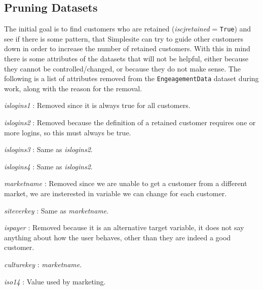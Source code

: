 \subsection{Pruning Datasets}

The initial goal is to find customers who are retained (\textit{iscjretained} =
\texttt{True}) and see if there is some pattern, that Simplesite can try to
guide other customers down in order to increase the number of retained
customers. With this in mind there is some attributes of the datasets that will
not be helpful, either because they cannot be controlled/changed, or because
they do not make sense. The following is a list of attributes removed from the
\texttt{EngeagementData} dataset during work, along with the reason for the
removal.

\begin{itemize*}
  \item \textit{islogins1} : Removed since it is always true for all customers.

	\item \textit{islogins2} : Removed because the definition of a retained
	      customer requires one or more logins, so this must always be true.

	\item \textit{islogins3} : Same as \textit{islogins2}.

	\item \textit{islogins4} : Same as \textit{islogins2}.

	\item \textit{marketname} : Removed since we are unable to get a customer from
	      a different market, we are insterested in variable we can change for
	      each customer.

	\item \textit{siteverkey} : Same as \textit{marketname}.

	\item \textit{ispayer} : Removed because it is an alternative target variable,
	      it does not say anything about how the user behaves, other than they are
	      indeed a good customer.

	\item \textit{culturekey} : \textit{marketname}.

	\item \textit{iso14} : Value used by marketing. 
\end{itemize*}

